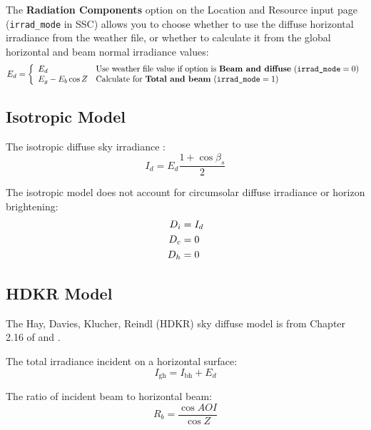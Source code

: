 \documentclass[12pt,letterpaper]{article}
\newcommand\AOI{\ensuremath{\mathit{AOI}}}
\begin{document}
The \textbf{Radiation Components} option on the Location and Resource input page (\texttt{irrad\_mode} in SSC) allows you to choose whether to use the diffuse horizontal irradiance from the weather file, or whether to calculate it from the global horizontal and beam normal irradiance values:
\begin{equation}\label{eqn-diffhoriz}
E_d = \left\{
\begin{array}{ll}
E_d & \text{Use weather file value if option is \textbf{Beam and diffuse} ($\texttt{irrad\_mode}=0)$}\\
E_g - E_b\cos Z & \text{Calculate for \textbf{Total and beam} ($\texttt{irrad\_mode}=1)$}
\end{array}
\right.
\end{equation}

\subsection{Isotropic Model}

The isotropic diffuse sky irradiance \citep{liu1963}:
\begin{equation}
I_d = E_d\frac{1 + \cos\beta_s}{2}
\end{equation}

The isotropic model does not account for circumsolar diffuse irradiance or horizon brightening:
\begin{align}
D_i &= I_d \notag\\
D_c &= 0 \notag\\
D_h &= 0
\end{align}

\subsection{HDKR Model}

The Hay, Davies, Klucher, Reindl (HDKR) sky diffuse model is from Chapter 2.16 of \citet{duffie2013} and \citet{reindl1988}.

The total irradiance incident on a horizontal surface:
\begin{equation}
I_{\mathrm{gh}} = I_{\mathrm{bh}} + E_d
\end{equation}

The ratio of incident beam to horizontal beam:
\begin{equation}
R_b = \frac{\cos\AOI}{\cos Z}
\end{equation}
\end{document}
